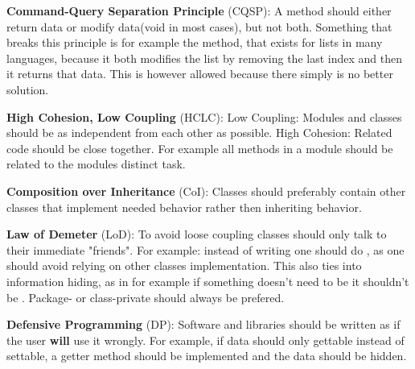 \documentclass{article}
\begin{document}
\begin{enumerate}
          \textbf{Command-Query Separation Principle} (CQSP):\newline
          A method should either return data or modify data(void in most cases),
          but not both.\newline
          Something that breaks this principle is for example the  method, that
          exists for lists in many languages, because it both modifies the list by removing
          the last index and then it returns that data. This is however allowed because there
          simply is no better solution.

          \textbf{High Cohesion, Low Coupling} (HCLC):\newline
          Low Coupling: Modules and classes should be as independent from each other as possible.
          \newline
          High Cohesion: Related code should be close together. For example all methods
          in a module should be related to the modules distinct task.

          \textbf{Composition over Inheritance} (CoI):\newline
          Classes should preferably contain other classes that implement needed behavior rather
          then inheriting behavior.

          \textbf{Law of Demeter} (LoD):\newline
          To avoid loose coupling classes should only talk to their immediate "friends".\newline
          For example: instead of writing  one should do ,
          as one should avoid relying on other classes implementation. This also ties into
          information hiding, as in for example if something doesn't need to be  it shouldn't
          be . Package- or class-private should always be prefered.

          \textbf{Defensive Programming} (DP):\newline
          Software and libraries should be written as if the user \textbf{will} use it wrongly.
          For example, if data should only gettable instead of settable, a getter method
          should be implemented and the data should be hidden.
\end{enumerate}
\newpage
\end{document}
